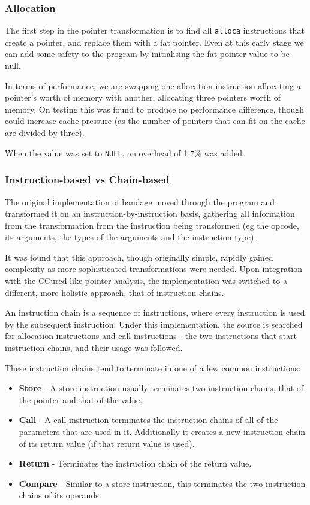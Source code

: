 \subsubsection{Allocation}

The first step in the pointer transformation is to find all \verb!alloca! instructions that create a pointer, and replace them with a fat pointer.
Even at this early stage we can add some safety to the program by initialising the fat pointer value to be null.

In terms of performance, we are swapping one allocation instruction allocating a pointer's worth of memory with another, allocating three pointers worth of memory. 
On testing this was found to produce no performance difference, though could increase cache pressure (as the number of pointers that can fit on the cache are divided by three).

When the value was set to \verb!NULL!, an overhead of 1.7\% was added.

\subsubsection{Instruction-based vs Chain-based}

The original implementation of bandage moved through the program and transformed it on an instruction-by-instruction basis, gathering all information from the transformation from the instruction being transformed (eg the opcode, its arguments, the types of the arguments and the instruction type).

It was found that this approach, though originally simple, rapidly gained complexity as more sophisticated transformations were needed.
Upon integration with the CCured-like pointer analysis, the implementation was switched to a different, more holistic approach, that of instruction-chains.

An instruction chain is a sequence of instructions, where every instruction is used by the subsequent instruction.
Under this implementation, the source is searched for allocation instructions and call instructions - the two instructions that start instruction chains, and their usage was followed.

These instruction chains tend to terminate in one of a few common instructions:

\begin{itemize}
\item \textbf{Store} - A store instruction usually terminates two instruction chains, that of the pointer and that of the value.
\item \textbf{Call} - A call instruction terminates the instruction chains of all of the parameters that are used in it. Additionally it creates a new instruction chain of its return value (if that return value is used).
\item \textbf{Return} - Terminates the instruction chain of the return value.
\item \textbf{Compare} - Similar to a store instruction, this terminates the two instruction chains of its operands.
\end{itemize}

